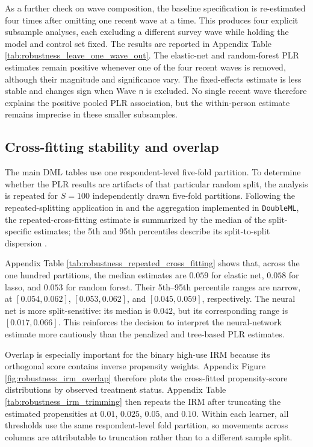 \documentclass[11pt,oneside,a4paper]{book}
\begin{document}
As a further check on wave composition, the baseline specification is re-estimated four times after omitting one recent wave at a time. This produces four explicit subsample analyses, each excluding a different survey wave while holding the model and control set fixed. The results are reported in Appendix Table \ref{tab:robustness_leave_one_wave_out}. The elastic-net and random-forest PLR estimates remain positive whenever one of the four recent waves is removed, although their magnitude and significance vary. The fixed-effects estimate is less stable and changes sign when Wave \texttt{n} is excluded. No single recent wave therefore explains the positive pooled PLR association, but the within-person estimate remains imprecise in these smaller subsamples.

\subsection[Cross-Fitting Stability and Overlap]{Cross-fitting stability and overlap}

The main DML tables use one respondent-level five-fold partition. To determine whether the PLR results are artifacts of that particular random split, the analysis is repeated for \(S=100\) independently drawn five-fold partitions. Following the repeated-splitting application in \citet{helal2026returns} and the aggregation implemented in \texttt{DoubleML}, the repeated-cross-fitting estimate is summarized by the median of the split-specific estimates; the 5th and 95th percentiles describe its split-to-split dispersion \citep{chernozhukov2018dml,doubleml_docs2026}.

Appendix Table \ref{tab:robustness_repeated_cross_fitting} shows that, across the one hundred partitions, the median estimates are \(0.059\) for elastic net, \(0.058\) for lasso, and \(0.053\) for random forest. Their 5th--95th percentile ranges are narrow, at \([0.054,0.062]\), \([0.053,0.062]\), and \([0.045,0.059]\), respectively. The neural net is more split-sensitive: its median is \(0.042\), but its corresponding range is \([0.017,0.066]\). This reinforces the decision to interpret the neural-network estimate more cautiously than the penalized and tree-based PLR estimates.

Overlap is especially important for the binary high-use IRM because its orthogonal score contains inverse propensity weights. Appendix Figure \ref{fig:robustness_irm_overlap} therefore plots the cross-fitted propensity-score distributions by observed treatment status. Appendix Table \ref{tab:robustness_irm_trimming} then repeats the IRM after truncating the estimated propensities at \(0.01\), \(0.025\), \(0.05\), and \(0.10\). Within each learner, all thresholds use the same respondent-level fold partition, so movements across columns are attributable to truncation rather than to a different sample split.
\end{document}
